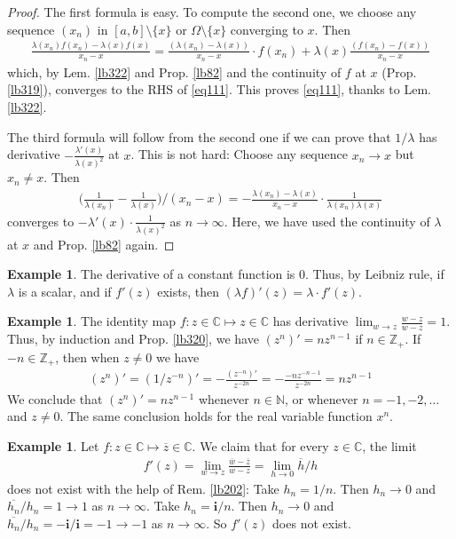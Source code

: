 \documentclass[12pt,b5paper,notitlepage]{article}
\theoremstyle{definition}
\newtheorem{eg}[df]{Example}
\theoremstyle{plain}
\newcommand{\ovl}{\overline}
\newcommand{\im}{\mathbf{i}}
\newcommand{\Cbb}{\mathbb C}
\newcommand{\Nbb}{\mathbb N}
\newcommand{\Zbb}{\mathbb Z}
\numberwithin{equation}{section}
\begin{document}
\begin{proof}
The first formula is easy. To compute the second one, we choose any sequence $(x_n)$ in $[a,b]\setminus \{x\}$ or $\Omega\setminus\{x\}$ converging to $x$. Then
\begin{align*}
\frac{\lambda(x_n)f(x_n)-\lambda(x)f(x)}{x_n-x}=\frac{(\lambda(x_n)-\lambda(x))}{x_n-x}\cdot f(x_n)+\lambda(x)\frac{(f(x_n)-f(x))}{x_n-x}
\end{align*}
which, by Lem. \ref{lb322} and Prop. \ref{lb82} and the continuity of $f$ at $x$ (Prop. \ref{lb319}), converges to the RHS of \eqref{eq111}. This proves \eqref{eq111}, thanks to Lem. \ref{lb322}.

The third formula will follow from the second one if we can prove that $1/\lambda$ has derivative $-\frac{\lambda'(x)}{\lambda(x)^2}$ at $x$. This is not hard: Choose any sequence $x_n\rightarrow x$ but $x_n\neq x$. Then
\begin{align*}
\Big(\frac 1{\lambda(x_n)}-\frac 1{\lambda(x)}\Big)\Big/ (x_n-x)=-\frac{\lambda(x_n)-\lambda(x)}{x_n-x}\cdot \frac 1{\lambda(x_n)\lambda(x)}
\end{align*}
converges to $-\lambda'(x)\cdot \frac 1{\lambda(x)^2}$ as $n\rightarrow \infty$. Here, we have used the continuity of $\lambda$ at $x$ and Prop. \ref{lb82} again.
\end{proof}




\begin{eg}
The derivative of a constant function is $0$. Thus, by Leibniz rule, if $\lambda$ is a scalar, and if $f'(z)$ exists, then $(\lambda f)'(z)=\lambda\cdot f'(z)$.
\end{eg}

\begin{eg}\label{lb323}
The identity map $f:z\in\Cbb\mapsto z\in\Cbb$ has derivative $\lim_{w\rightarrow z}\frac{w-z}{w-z}=1$. Thus, by induction and Prop. \ref{lb320}, we have $(z^n)'=nz^{n-1}$ if $n\in\Zbb_+$. If $-n\in\Zbb_+$, then when $z\neq 0$ we have
\begin{align*}
(z^n)'=(1/z^{-n})'=-\frac{(z^{-n})'}{z^{-2n}}=-\frac{-nz^{-n-1}}{z^{-2n}}=nz^{n-1}
\end{align*}
We conclude that $(z^n)'=nz^{n-1}$ whenever $n\in\Nbb$, or whenever $n=-1,-2,\dots$ and $z\neq0$. The same conclusion holds for the real variable function $x^n$.
\end{eg}


\begin{eg}
Let $f:z\in\Cbb\mapsto\ovl z\in\Cbb$. We claim that for every $z\in\Cbb$, the limit
\begin{align}
f'(z)=\lim_{w\rightarrow z}\frac{\ovl w-\ovl z}{w-z}=\lim_{h\rightarrow 0}\ovl h/h
\end{align}
does not exist with the help of Rem. \ref{lb202}: Take $h_n=1/n$. Then $h_n\rightarrow 0$ and $\ovl {h_n}/h_n=1\rightarrow 1$ as $n\rightarrow\infty$. Take $h_n=\im/n$. Then $h_n\rightarrow 0$ and $\ovl {h_n}/h_n=-\im/\im=-1\rightarrow-1$ as $n\rightarrow\infty$. So $f'(z)$ does not exist.
\end{eg}
\end{document}
